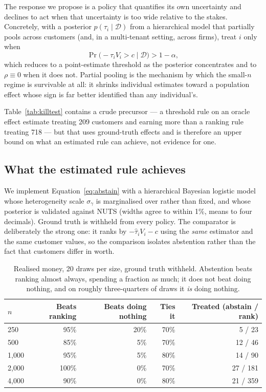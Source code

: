 \documentclass[11pt,a4paper]{article}
\newcommand{\CATE}{\tau}
\begin{document}
The response we propose is a policy that quantifies its own uncertainty and declines
to act when that uncertainty is too wide relative to the stakes. Concretely, with a
posterior $p(\CATE_i \mid \mathcal{D})$ from a hierarchical model that partially
pools across customers (and, in a multi-tenant setting, across firms), treat $i$
only when
\begin{equation}
  \label{eq:abstain}
  \Pr\bigl(-\CATE_i V_i > c \;\big|\; \mathcal{D}\bigr) > 1 - \alpha ,
\end{equation}
which reduces to a point-estimate threshold as the posterior concentrates and to
$\rho \equiv 0$ when it does not. Partial pooling is the mechanism by which the
small-$n$ regime is survivable at all: it shrinks individual estimates toward a
population effect whose sign is far better identified than any individual's.

Table~\ref{tab:killtest} contains a crude precursor --- a threshold rule on an
oracle effect estimate treating 209 customers and earning more than a ranking rule
treating 718 --- but that uses ground-truth effects and is therefore an upper bound
on what an estimated rule can achieve, not evidence for one.

\subsection{What the estimated rule achieves}

We implement Equation~\eqref{eq:abstain} with a hierarchical Bayesian logistic model
whose heterogeneity scale $\sigma_\gamma$ is marginalised over rather than fixed, and
whose posterior is validated against NUTS (widths agree to within 1\%, means to four
decimals). Ground truth is withheld from every policy. The comparator is deliberately
the strong one: it ranks by $-\hat\CATE_i V_i - c$ using the \emph{same} estimator and
the same customer values, so the comparison isolates abstention rather than the fact
that customers differ in worth.

\begin{table}[t]
\centering
\begin{tabular}{lrrrr}
\toprule
$n$ & Beats ranking & Beats doing nothing & Ties it & Treated (abstain / rank) \\
\midrule
250   & 95\%  & 20\% & 70\% & 5 / 23 \\
500   & 85\%  & 5\%  & 70\% & 12 / 46 \\
1{,}000 & 95\%  & 5\%  & 80\% & 14 / 90 \\
2{,}000 & 100\% & 0\%  & 70\% & 27 / 181 \\
4{,}000 & 90\%  & 0\%  & 80\% & 21 / 359 \\
\bottomrule
\end{tabular}
\caption{Realised money, 20 draws per size, ground truth withheld. Abstention beats
ranking almost always, spending a fraction as much; it does not beat doing nothing,
and on roughly three-quarters of draws it \emph{is} doing nothing.}
\label{tab:abstain}
\end{table}
\end{document}
